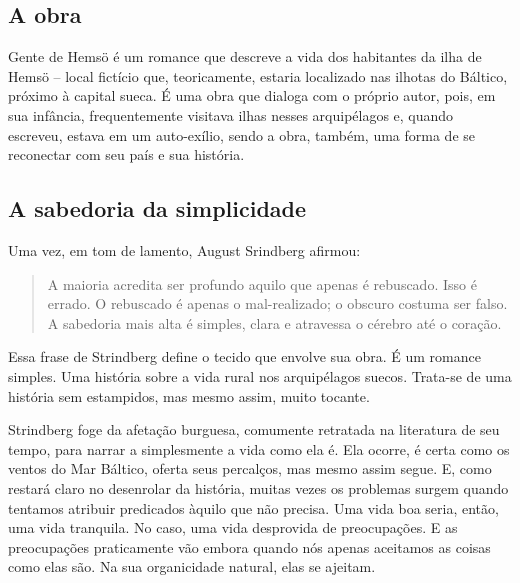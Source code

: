 \documentclass[12pt]{extarticle}
\begin{document}
\subsection{A obra}

Gente de Hemsö é um romance que descreve a vida dos habitantes da ilha
de Hemsö -- local fictício que, teoricamente, estaria localizado nas
ilhotas do Báltico, próximo à capital sueca. É uma obra que dialoga com
o próprio autor, pois, em sua infância, frequentemente visitava ilhas
nesses arquipélagos e, quando escreveu, estava em um auto-exílio, sendo
a obra, também, uma forma de se reconectar com seu país e sua história.




\subsection{A sabedoria da simplicidade}

Uma vez, em tom de lamento, August Srindberg afirmou:

\begin{quote}
A maioria acredita ser profundo aquilo que apenas é rebuscado. Isso é
errado. O rebuscado é apenas o mal-realizado; o obscuro costuma ser
falso. A sabedoria mais alta é simples, clara e atravessa o cérebro até
o coração.
\end{quote}

Essa frase de Strindberg define o tecido que envolve sua obra. É um
romance simples. Uma história sobre a vida rural nos arquipélagos
suecos. Trata-se de uma história sem estampidos, mas mesmo assim, muito
tocante.




Strindberg foge da afetação burguesa, comumente retratada na literatura
de seu tempo, para narrar a simplesmente a vida como ela é. Ela ocorre,
é certa como os ventos do Mar Báltico, oferta seus percalços, mas mesmo
assim segue. E, como restará claro no desenrolar da história, muitas
vezes os problemas surgem quando tentamos atribuir predicados àquilo que
não precisa. Uma vida boa seria, então, uma vida tranquila. No caso, uma
vida desprovida de preocupações. E as preocupações praticamente vão
embora quando nós apenas aceitamos as coisas como elas são. Na sua
organicidade natural, elas se ajeitam.
\end{document}
